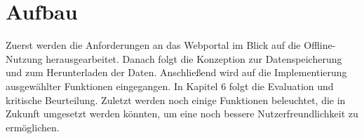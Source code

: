 \section{Aufbau}
Zuerst werden die Anforderungen an das Webportal im Blick auf die Offline-Nutzung herausgearbeitet. Danach folgt die Konzeption zur Datenspeicherung und zum Herunterladen der Daten. Anschließend wird auf die Implementierung ausgewählter Funktionen eingegangen. In Kapitel 6 folgt die Evaluation und kritische Beurteilung. Zuletzt werden noch einige Funktionen beleuchtet, die in Zukunft umgesetzt werden könnten, um eine noch bessere Nutzerfreundlichkeit zu ermöglichen.
